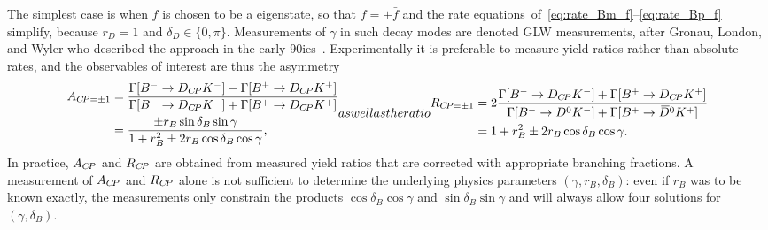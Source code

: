 The simplest case is when $f$ is chosen to be a \CP eigenstate, so that $f=\pm\bar f$ and the rate equations~of~\eqref{eq:rate_Bm_f}--\eqref{eq:rate_Bp_f} simplify, because $r_D=1$ and $\delta_D\in\{0,\pi\}$. Measurements of $\gamma$ in such decay modes are denoted GLW measurements, after  Gronau, London, and Wyler who described the approach in the early 90ies~\cite{gronauDeterminingWeakPhase1991,gronauHowDetermineAll1991}. Experimentally it is preferable to measure yield ratios rather than absolute rates, and the observables of interest are thus the \CP asymmetry
\begin{subequations}\label{eq:GLW_observables}
\begin{align}
\begin{split}
    A_{\CP=\pm1} &= \frac{\Gamma[\Bm\to D_{\CP}\Km] - \Gamma[\Bp\to D_{\CP}\Kp]}{\Gamma[\Bm\to D_{\CP}\Km] + \Gamma[\Bp\to D_{\CP}\Kp]} \\
    &= \frac{\pm r_B \sin \delta_B \sin \gamma}{1 + r_B^2 \pm 2 r_B \cos \delta_B \cos \gamma},
\end{split}
\end{align}
as well as the ratio
\begin{align}
\begin{split}
    R_{\CP=\pm 1} &= 2\frac{\Gamma[\Bm\to D_{\CP}\Km] + \Gamma[\Bp\to D_{\CP}\Kp]}{\Gamma[\Bm\to \Dz\Km] + \Gamma[\Bp\to \Dzb\Kp]} \\
    &=  1 + r_B^2 \pm 2 r_B \cos \delta_B \cos \gamma.
\end{split}
\end{align}
\end{subequations}
In practice, $A_{{C\!P}}$ and $R_{{C\!P}}$ are obtained from measured yield ratios that are corrected with appropriate branching fractions. A measurement of $A_{{C\!P}}$ and $R_{{C\!P}}$ alone is not sufficient to determine the underlying physics parameters $(\gamma, r_B, \delta_B)$: even if $r_B$ was to be known exactly, the measurements only constrain the products $\cos \delta_B \cos \gamma$ and $\sin \delta_B \sin \gamma$ and will always allow four solutions for $(\gamma, \delta_B)$. 
